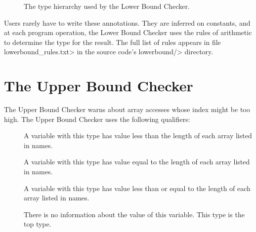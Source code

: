 \begin{figure}
\caption{The type hierarchy used by the Lower Bound Checker.}
\label{fig-lowerbound-types}
\end{figure}

Users rarely have to write these annotations.  They are inferred on
constants, and at each program operation, the Lower Bound
Checker uses the rules of arithmetic to determine the type for the result.
The full list of rules appears in file \<lowerbound\_rules.txt> in the
source code's \<lowerbound/> directory.


\section{The Upper Bound Checker\label{index-upperbound}}

The Upper Bound Checker warns about array accesses whose index might be
too high. The Upper Bound Checker uses the following
qualifiers:

\begin{description}
\item[]
  A variable with this type
  has value less than the length of each array listed in names.
\item[]
  A variable with this type
  has value equal to the length of each array listed in names.
\item[]
  A variable with this type
  has value less than or equal to the length of each array listed in names.
\item[]
  There is no information about the value of this variable.
  This type is the top type.
\end{description}
